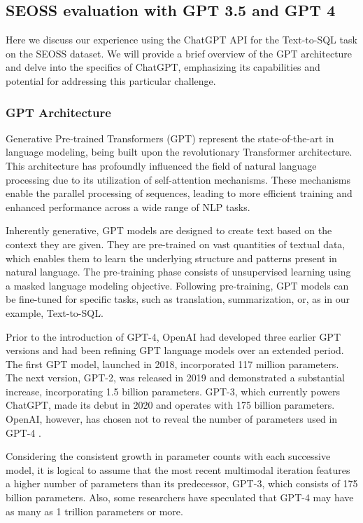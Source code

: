 \subsection{SEOSS evaluation with GPT 3.5 and GPT 4}  

Here we discuss our experience using the ChatGPT API for the Text-to-SQL task on the SEOSS dataset. We will provide a brief overview of the \ac{GPT} architecture and delve into the specifics of ChatGPT, emphasizing its capabilities and potential for addressing this particular challenge.
\subsubsection{GPT Architecture}

Generative Pre-trained Transformers (GPT) \cite{radford2018improving} represent the state-of-the-art in language modeling, being built upon the revolutionary Transformer architecture. This architecture has profoundly influenced the field of natural language processing due to its utilization of self-attention mechanisms. These mechanisms enable the parallel processing of sequences, leading to more efficient training and enhanced performance across a wide range of NLP tasks.

Inherently generative, GPT models are designed to create text based on the context they are given. They are pre-trained on vast quantities of textual data, which enables them to learn the underlying structure and patterns present in natural language. The pre-training phase consists of unsupervised learning using a masked language modeling objective. Following pre-training, GPT models can be fine-tuned for specific tasks, such as translation, summarization, or, as in our example, Text-to-SQL.

Prior to the introduction of GPT-4, OpenAI had developed three earlier GPT versions and had been refining GPT language models over an extended period. The first GPT model, launched in 2018, incorporated 117 million parameters. The next version, GPT-2, was released in 2019 and demonstrated a substantial increase, incorporating 1.5 billion parameters. GPT-3, which currently powers ChatGPT, made its debut in 2020 and operates with 175 billion parameters. OpenAI, however, has chosen not to reveal the number of parameters used in GPT-4 \cite{openai2023gpt4}.

Considering the consistent growth in parameter counts with each successive model, it is logical to assume that the most recent multimodal iteration features a higher number of parameters than its predecessor, GPT-3, which consists of 175 billion parameters. Also, some researchers have speculated that GPT-4 may have as many as 1 trillion parameters or more\cite{bubeck2023sparks}.

